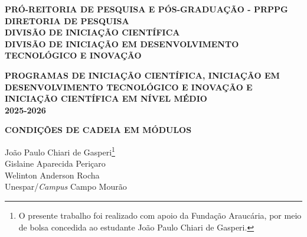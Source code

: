 \documentclass[12pt,a4paper]{article}
\begin{document}
\begin{center}
\textbf{PRÓ-REITORIA DE PESQUISA E PÓS-GRADUAÇÃO - PRPPG}\\
\textbf{DIRETORIA DE PESQUISA}\\
\textbf{DIVISÃO DE INICIAÇÃO CIENTÍFICA}\\
\textbf{DIVISÃO DE INICIAÇÃO EM DESENVOLVIMENTO TECNOLÓGICO E INOVAÇÃO}

\medskip
\textbf{PROGRAMAS DE INICIAÇÃO CIENTÍFICA, INICIAÇÃO EM DESENVOLVIMENTO TECNOLÓGICO E INOVAÇÃO E INICIAÇÃO CIENTÍFICA EM NÍVEL MÉDIO}\\
\textbf{2025-2026}

\bigskip
\textbf{CONDIÇÕES DE CADEIA EM MÓDULOS}
\end{center}

\bigskip
\begin{flushright}
João Paulo Chiari de Gasperi\footnote{O presente trabalho foi realizado com apoio da Fundação Araucária, por meio de bolsa concedida ao estudante João Paulo Chiari de Gasperi.}\\
Gislaine Aparecida Periçaro\\
Welinton Anderson Rocha\\
Unespar/\textit{Campus} Campo Mourão
\end{flushright}

\bigskip\bigskip


\end{document}
